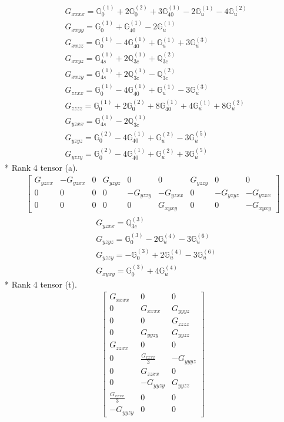 \documentclass[fleqn,8pt,landscape]{jsarticle}
\begin{document}
\begin{align*}
& G_{xxxx} = \mathbb{G}_{0}^{(1)} + 2 \mathbb{G}_{0}^{(2)} + 3 \mathbb{G}_{40}^{(1)} - 2 \mathbb{G}_{u}^{(1)} - 4 \mathbb{G}_{u}^{(2)} \\
& G_{xxyy} = \mathbb{G}_{0}^{(1)} + \mathbb{G}_{40}^{(1)} - 2 \mathbb{G}_{u}^{(1)} \\
& G_{xxzz} = \mathbb{G}_{0}^{(1)} - 4 \mathbb{G}_{40}^{(1)} + \mathbb{G}_{u}^{(1)} + 3 \mathbb{G}_{u}^{(3)} \\
& G_{xxyz} = \mathbb{G}_{4s}^{(1)} + 2 \mathbb{Q}_{3c}^{(1)} + \mathbb{Q}_{3c}^{(2)} \\
& G_{xxzy} = \mathbb{G}_{4s}^{(1)} + 2 \mathbb{Q}_{3c}^{(1)} - \mathbb{Q}_{3c}^{(2)} \\
& G_{zzxx} = \mathbb{G}_{0}^{(1)} - 4 \mathbb{G}_{40}^{(1)} + \mathbb{G}_{u}^{(1)} - 3 \mathbb{G}_{u}^{(3)} \\
& G_{zzzz} = \mathbb{G}_{0}^{(1)} + 2 \mathbb{G}_{0}^{(2)} + 8 \mathbb{G}_{40}^{(1)} + 4 \mathbb{G}_{u}^{(1)} + 8 \mathbb{G}_{u}^{(2)} \\
& G_{yzxx} = \mathbb{G}_{4s}^{(1)} - 2 \mathbb{Q}_{3c}^{(1)} \\
& G_{yzyz} = \mathbb{G}_{0}^{(2)} - 4 \mathbb{G}_{40}^{(1)} + \mathbb{G}_{u}^{(2)} - 3 \mathbb{G}_{u}^{(5)} \\
& G_{yzzy} = \mathbb{G}_{0}^{(2)} - 4 \mathbb{G}_{40}^{(1)} + \mathbb{G}_{u}^{(2)} + 3 \mathbb{G}_{u}^{(5)}
\end{align*}
* Rank 4 tensor (a).
\begin{align*}
\begin{bmatrix} G_{yzxx} & - G_{yzxx} & 0 & G_{yzyz} & 0 & 0 & G_{yzzy} & 0 & 0 \\ 0 & 0 & 0 & 0 & - G_{yzzy} & - G_{yzxx} & 0 & - G_{yzyz} & - G_{yzxx} \\ 0 & 0 & 0 & 0 & 0 & G_{xyxy} & 0 & 0 & - G_{xyxy} \end{bmatrix}
\end{align*}
\begin{align*}
& G_{yzxx} = \mathbb{Q}_{3c}^{(3)} \\
& G_{yzyz} = \mathbb{G}_{0}^{(3)} - 2 \mathbb{G}_{u}^{(4)} - 3 \mathbb{G}_{u}^{(6)} \\
& G_{yzzy} = - \mathbb{G}_{0}^{(3)} + 2 \mathbb{G}_{u}^{(4)} - 3 \mathbb{G}_{u}^{(6)} \\
& G_{xyxy} = \mathbb{G}_{0}^{(3)} + 4 \mathbb{G}_{u}^{(4)}
\end{align*}
* Rank 4 tensor (t).
\begin{align*}
\begin{bmatrix} G_{xxxx} & 0 & 0 \\ 0 & G_{xxxx} & G_{yyyz} \\ 0 & 0 & G_{zzzz} \\ 0 & G_{yyzy} & G_{yyzz} \\ G_{zzxx} & 0 & 0 \\ 0 & \frac{G_{xxxx}}{3} & - G_{yyyz} \\ 0 & G_{zzxx} & 0 \\ 0 & - G_{yyzy} & G_{yyzz} \\ \frac{G_{xxxx}}{3} & 0 & 0 \\ - G_{yyzy} & 0 & 0 \end{bmatrix}
\end{align*}
\end{document}

